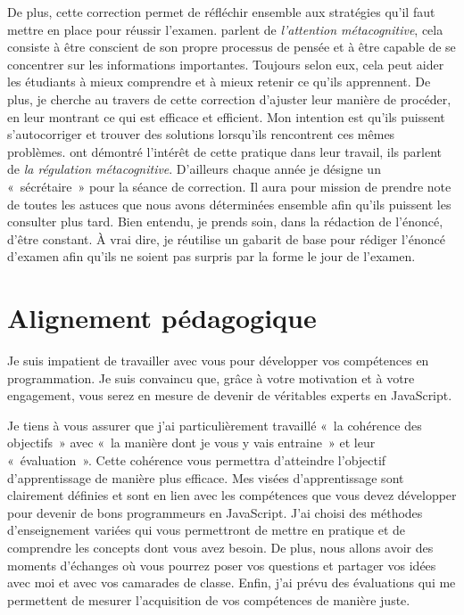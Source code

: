 De plus, cette correction permet de réfléchir ensemble aux stratégies qu'il faut mettre en place pour réussir l'examen. \citet{winne1998studying} parlent de \emph{l'attention métacognitive}, cela consiste à être conscient de son propre processus de pensée et à être capable de se concentrer sur les informations importantes. Toujours selon eux, cela peut aider les étudiants à mieux comprendre et à mieux retenir ce qu'ils apprennent. De plus, je cherche au travers de cette correction d'ajuster leur manière  de procéder, en leur montrant ce qui est efficace et efficient. Mon intention est qu'ils puissent s'autocorriger et trouver des solutions lorsqu'ils rencontrent ces mêmes problèmes. \citet{zimmerman1986becoming} ont démontré l'intérêt de cette pratique dans leur travail, ils parlent de \emph{la régulation métacognitive}.
D'ailleurs chaque année je désigne un «~sécrétaire~» pour la séance de correction. Il aura pour mission de prendre note de toutes les astuces que nous avons déterminées ensemble afin qu’ils puissent les consulter plus tard. Bien entendu, je prends soin, dans la rédaction de l'énoncé, d'être constant. À vrai dire, je réutilise un gabarit de base pour rédiger l'énoncé d’examen afin qu’ils ne soient pas surpris par la forme le jour de l'examen.


\clearpage
\section{Alignement pédagogique}

Je suis impatient de travailler avec vous pour développer vos compétences en programmation. Je suis convaincu que, grâce à votre motivation et à votre engagement, vous serez en mesure de devenir de véritables experts en JavaScript.

Je tiens à vous assurer que j'ai particulièrement travaillé «~la cohérence des objectifs~» avec «~la manière dont je vous y vais entraine~» et leur «~évaluation~». Cette cohérence vous permettra d'atteindre l'objectif d'apprentissage de manière plus efficace. Mes visées d'apprentissage sont clairement définies et sont en lien avec les compétences que vous devez développer pour devenir de bons programmeurs en JavaScript. J'ai choisi des méthodes d'enseignement variées qui vous permettront de mettre en pratique et de comprendre les concepts dont vous avez besoin. De plus, nous allons avoir des moments d'échanges où vous pourrez poser vos questions et partager vos idées avec moi et avec vos camarades de classe. Enfin, j'ai prévu des évaluations qui me permettent de mesurer l'acquisition de vos compétences de manière juste.


